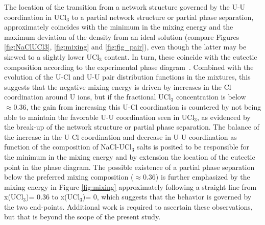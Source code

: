 \documentclass[preprint,3p,10pt,onecolumn,number,sort&compress]{elsarticle}
\begin{document}
{The location of the transition from a network structure governed by the U-U coordination in UCl$_3$ to a partial network structure or partial phase separation, approximately coincides with the minimum in the mixing energy and the maximum deviation of the density from an ideal solution (compare Figures \ref{fig:NaClUCl3}, \ref{fig:mixing} and \ref{fig:fig_pair}), even though the latter may be skewed to a slightly lower UCl$_3$ content. In turn, these coincide with the eutectic composition according to the experimental phase diagram~\cite{YIN2020}. Combined with the evolution of the U-Cl and U-U pair distribution functions in the mixtures, this suggests that the negative mixing energy is driven by increases in the Cl coordination around U ions, but if the fractional UCl$_3$ concentration is below $\approx 0.36$, the gain from increasing this U-Cl coordination is countered by not being able to maintain the favorable U-U coordination seen in UCl$_3$, as evidenced by the break-up of the network structure or partial phase separation. The balance of the increase in the U-Cl coordination and decrease in U-U coordination as function of the composition of NaCl-UCl$_3$ salts is posited to be responsible for the minimum in the mixing energy and by extension the location of the eutectic point in the phase diagram. The possible existence of a partial phase separation below the preferred mixing composition ($\approx 0.36$) is further emphasized by the mixing energy in Figure \ref{fig:mixing} approximately following a straight line from  x(UCl$_3$)= 0.36 to x(UCl$_3$)= 0, which suggests that the behavior is governed by the two end-points. Additional work is required to ascertain these observations, but that is beyond the scope of the present study.

}
\end{document}
